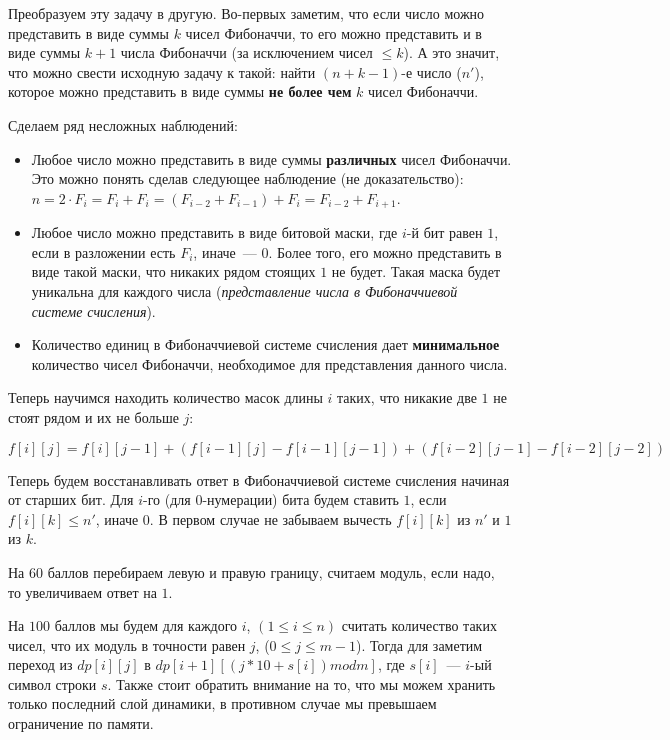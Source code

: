 \documentclass[12pt]{article}
\begin{document}

Преобразуем эту задачу в другую. Во-первых заметим, что если число можно представить в виде суммы $k$ чисел Фибоначчи, то его можно представить и
в виде суммы $k+1$ числа Фибоначчи (за исключением чисел $\le k$). А это значит, что можно свести исходную задачу к такой: найти $(n+k-1)$-е число ($n'$),
которое можно представить в виде суммы \textbf{не более чем} $k$ чисел Фибоначчи.

Сделаем ряд несложных наблюдений:
\begin{itemize}
	\item 
	Любое число можно представить в виде суммы \textbf{различных} чисел Фибоначчи.
	Это можно понять сделав следующее наблюдение (не доказательство):
	$n = 2 \cdot F_i = F_i + F_i = (F_{i-2} + F_{i-1}) + F_i = F_{i-2} + F_{i+1}$.
	\item
	Любое число можно представить в виде битовой маски, где $i$-й бит равен $1$, если в разложении есть $F_i$, иначе~--- $0$.
	Более того, его можно представить в виде такой маски, что никаких рядом стоящих $1$ не будет. Такая маска будет уникальна
	для каждого числа (\textit{представление числа в Фибоначчиевой системе счисления}).
	\item
	Количество единиц в Фибоначчиевой системе счисления дает \textbf{минимальное} количество чисел Фибоначчи, необходимое для представления
	данного числа.
\end{itemize}

Теперь научимся находить количество масок длины $i$ таких, что никакие две $1$ не стоят рядом и их не больше $j$:

$f[i][j] = f[i][j - 1] + (f[i - 1][j] - f[i - 1][j - 1]) + (f[i - 2][j - 1] - f[i - 2][j - 2])$

Теперь будем восстанавливать ответ в Фибоначчиевой системе счисления начиная от старших бит. Для $i$-го (для 0-нумерации) бита будем ставить $1$, если
$f[i][k] \le n'$, иначе $0$. В первом случае не забываем вычесть $f[i][k]$ из $n'$ и $1$ из $k$.

\EndEditorial


На $60$ баллов перебираем левую и правую границу, считаем модуль, если надо, то увеличиваем ответ на $1$.

На $100$ баллов мы будем для каждого $i$, $(1 \le i \le n)$ считать количество таких чисел, что их модуль в точности равен $j$, ($0 \le j \le m - 1$).
Тогда для заметим переход из $dp[i][j]$ в $dp[i + 1][(j * 10 + s[i]) mod m]$, где $s[i]$~--- $i$-ый символ строки $s$.
Также стоит обратить внимание на то, что мы можем хранить только последний слой динамики, в противном случае мы превышаем ограничение по памяти.
\end{document}
